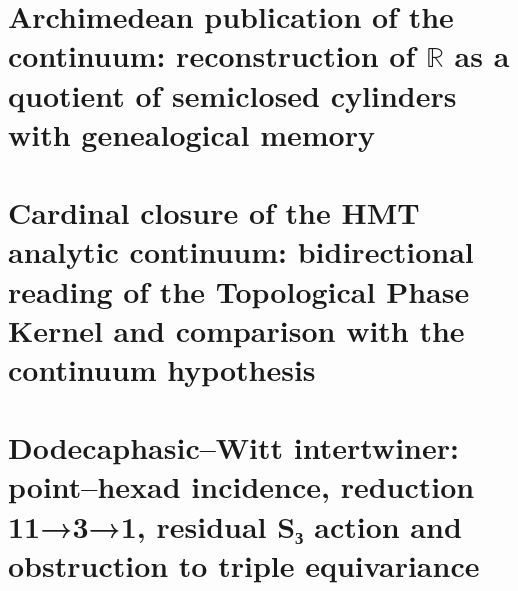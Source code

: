 \chapter{Archimedean publication of the continuum: reconstruction of \texorpdfstring{\(\mathbb R\)}{R} as a quotient of semiclosed cylinders with genealogical memory}
\label{chap:sucesor-102-18}

\begin{HMTSpiralIntegratedBody}

\end{HMTSpiralIntegratedBody}













\chapter{Cardinal closure of the HMT analytic continuum: bidirectional reading of the Topological Phase Kernel and comparison with the continuum hypothesis}
\label{chap:sucesor-102-19}

















\chapter{Dodecaphasic–Witt intertwiner: point–hexad incidence, reduction 11→3→1, residual S₃ action and obstruction to triple equivariance}
\label{chap:sucesor-102-20}
\begin{HMTScientificOwnerSubordinated}

\end{HMTScientificOwnerSubordinated}











